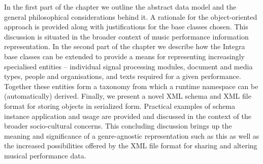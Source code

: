 \documentclass{article}
\begin{document}
In the first part of the chapter we outline the abstract data model and the general philosophical considerations behind it. A rationale for the object-oriented approach is provided along with justifications for the base classes chosen. This discussion is situated in the broader context of music performance information representation. In the second part of the chapter we describe how the Integra base classes can be extended to provide a means for representing increasingly specialised entities -- individual signal processing modules, document and media types, people and organisations, and texts required for a given performance. Together these entities form a taxonomy from which a runtime namespace can be (automatically) derived. %
Finally, we present a novel XML schema and XML file format for storing objects in serialized form. Practical examples of schema instance application and usage are provided and discussed in the context of the broader socio-cultural concerns. This concluding discussion brings up the meaning and significance of a genre-agnostic representation such as this as well as the increased possibilities offered by the XML file format for sharing and altering musical performance data.

\end{document}

